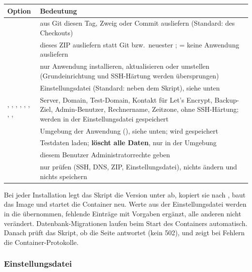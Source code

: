 \begin{center}
\begin{tabularx}{\textwidth}{L{2.6cm}X}
\toprule
\textbf{Option} & \textbf{Bedeutung} \\
\midrule
{} & aus Git diesen Tag, Zweig oder Commit ausliefern
  (Standard:  des Checkouts) \\
 & dieses ZIP ausliefern statt Git bzw.\ neuester
  ;  = keine Anwendung ausliefern \\
 & nur Anwendung installieren, aktualisieren oder umstellen
  (Grundeinrichtung und SSH-Härtung werden übersprungen) \\
 & Einstellungsdatei (Standard: 
  neben dem Skript), siehe unten \\
, , , , , , ,
  ,  & Server, Domain, Test-Domain, Kontakt für
  Let's Encrypt, Backup-Ziel, Admin-Benutzer, Rechnername, Zeitzone, ohne
  SSH-Härtung; werden in der Einstellungsdatei gespeichert \\
 & Umgebung der Anwendung (), siehe unten;
  wird gespeichert \\
 & Testdaten laden; \textbf{löscht alle Daten}, nur in der
  Umgebung  \\
 & diesem Benutzer Administratorrechte geben \\
 & nur prüfen (SSH, DNS, ZIP, Einstellungsdatei), nichts ändern
  und nichts speichern \\
\bottomrule
\end{tabularx}
\end{center}

Bei jeder Installation legt das Skript die Version unter
 ab, kopiert sie nach ,
baut das Image und startet die Container neu. Werte aus der
Einstellungsdatei werden in die  übernommen, fehlende Einträge mit
Vorgaben ergänzt, alle anderen nicht verändert. Datenbank-Migrationen
laufen beim Start des Containers  automatisch. Danach prüft das
Skript, ob die Seite antwortet (kein 502), und zeigt bei Fehlern die
Container-Protokolle.

\subsubsection*{Einstellungsdatei}\label{sec:einstellungen}

